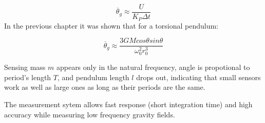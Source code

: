 \documentclass[\main/master.tex]{subfiles}
\begin{document}
\begin{equation}
\overline{\theta}_g \approx \frac{U}{K_P\Delta t}      \label{eqn:pid_gravitation_torque}
\end{equation}
In the previous chapter it was shown that for a torsional pendulum:

\begin{equation}
\overline{\theta}_g \approx \frac{3GMcos\theta sin\theta}{\omega_0^2 r_0^3}    \label{eqn:theta average}
\end{equation}
\par\noindent
Sensing mass $m$ appears only in the natural
frequency, angle is propotional to period's length $T$, and pendulum length $l$ drops out, indicating that small sensors work as well as large ones as long as their periods are the same.
\par\noindent
The measurement sytem allows fast response (short integration time) and high accuracy while measuring low frequency gravity fields. 

 
 
 
 
\end{document}
